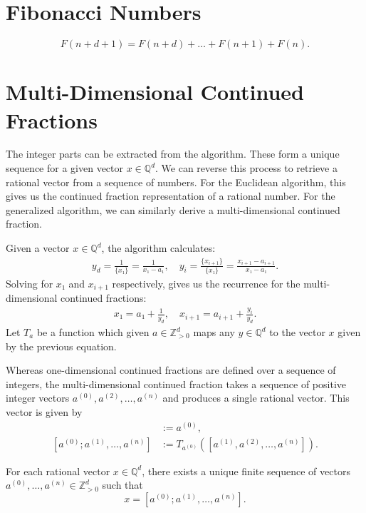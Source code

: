 \section{Fibonacci Numbers}

\[
  F(n + d + 1) = F(n + d) + \dots + F(n + 1) + F(n).
\]

\section{Multi-Dimensional Continued Fractions}

The integer parts can be extracted from the algorithm.
These form a unique sequence for a given vector $x ∈ ℚ^d$.
We can reverse this process to retrieve a rational vector from a sequence of numbers.
For the Euclidean algorithm, this gives us the continued fraction representation of a rational number.
For the generalized algorithm, we can similarly derive a multi-dimensional continued fraction.

Given a vector $x ∈ ℚ^d$, the algorithm calculates:
\begin{align*}
  y_d
  = \frac{1}{\{x₁\}}
  = \frac{1}{x₁ - a₁},
  \quad y_i
  = \frac{\{x_{i+1}\}}{\{x₁\}}
  = \frac{x_{i+1} - a_{i+1}}{x₁ - a₁}.
\end{align*}
Solving for $x₁$ and $x_{i+1}$ respectively,
gives us the recurrence for the multi-dimensional continued fractions:
\begin{align*}
  x₁ = a₁ + \frac{1}{y_d},
  \quad x_{i+1} = a_{i+1} + \frac{y_i}{y_d}.
\end{align*}
Let $T_a$ be a function which given $a ∈ ℤ_{> 0}^d$ maps any $y ∈ ℚ^d$ to the vector $x$ given by
the previous equation.

Whereas one-dimensional continued fractions are defined over a sequence of integers,
the multi-dimensional continued fraction takes a sequence of positive integer vectors
$a^{(0)}, a^{(2)}, \dots, a^{(n)}$ and produces a single rational vector.
This vector is given by
\begin{align*}
  [a^{(0)}] & := a^{(0)}, \\
  [a^{(0)}; a^{(1)}, \dots, a^{(n)}] & := T_{a^{(0)}}([a^{(1)}, a^{(2)}, \dots, a^{(n)}]).
\end{align*}

\begin{lemma}
  For each rational vector $x ∈ ℚ^d$, there exists a unique finite sequence of vectors $a^{(0)}, \dots, a^{(n)} ∈ ℤ_{> 0}^d$
  such that
  \[
    x = [a^{(0)}; a^{(1)}, \dots, a^{(n)}].
  \]
\end{lemma}


